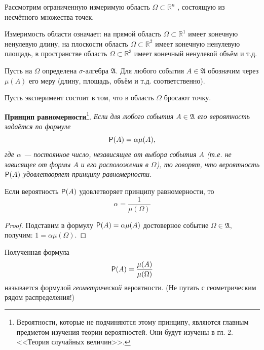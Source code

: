 Рассмотрим ограниченную измеримую область $\Omega \subset \mathbb{R}^n$ , состоящую из несчётного множества точек.

Измеримость области означает: на прямой область $\Omega \subset \mathbb{R}^1$ имеет конечную ненулевую длину, на плоскости область $\Omega \subset \mathbb{R}^2$ имеет конечную ненулевую площадь, в пространстве область $\Omega \subset \mathbb{R}^3$ имеет конечный ненулевой объём и т.д. 

Пусть на $\Omega$ определена $\sigma$-алгебра $\mathfrak{A}$. Для любого события $A \in \mathfrak{A}$ обозначим через $\mu(A)$ его меру (длину, площадь, объём и т.д. соответственно). 

Пусть эксперимент состоит в том, что в область $\Omega$ бросают точку.

\textbf{Принцип равномерности}\footnote{
Вероятности, которые не подчиняются этому принципу, являются главным предметом изучения теории вероятностей. Они будут изучены в гл. 2. <<Теория случайных величин>>.	
}. 
\textit{Если для любого события $A \in \mathfrak{A}$ его вероятность задаётся по формуле
$$\P(A) = \alpha \mu(A),$$
где $\alpha$ — постоянное число, независящее от выбора события $A$ (т.е. не зависящее от формы $A$ и его расположения в $\Omega$), то говорят, что вероятность $\P(A)$ удовлетворяет принципу равномерности.}

\begin{lemma}
	\label{lemma:4.19}
Если вероятность $\P(A)$ удовлетворяет принципу равномерности, то
$$\alpha=\frac{1}{\mu(\Omega)}$$
\end{lemma}

\begin{proof}
	Подставим в формулу $\P(A) = \alpha \mu(A)$ достоверное событие $\Omega \in \mathfrak{A}$, получим: $1 = \alpha\mu(\Omega).$
\end{proof} 

\begin{definition}
	\label{def:4.20}
Полученная формула
$$\P(A) = \frac{\mu(A)}{\mu(\Omega)}$$
называется формулой \textit{геометрической} вероятности. (Не путать с геометрическим рядом распределения!)
\end{definition}

